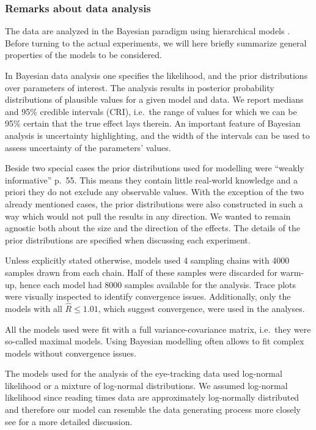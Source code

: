 
\hypertarget{remarks-about-data-analysis}{%
\subsubsection{Remarks about data
analysis}\label{remarks-about-data-analysis}}

The data are analyzed in the Bayesian paradigm using hierarchical models
\citep{gelman2003bda,gelman2006data,mcelreath2018statistical,nicenboim2021introd_bayes_data}.
Before turning to the actual experiments, we will here briefly summarize
general properties of the models to be considered.

In Bayesian data analysis one specifies the likelihood, and the prior
distributions over parameters of interest. The analysis results in
posterior probability distributions of plausible values for a given
model and data. We report medians and 95\% credible intervals (CRI),
i.e.~the range of values for which we can be 95\% certain that the true
effect lays therein. An important feature of Bayesian analysis is
uncertainty highlighting, and the width of the intervals can be used to
assess uncertainty of the parameters' values.

Beside two special cases the prior distributions used for modelling were
``weakly informative'' \citep{gelman2003bda} p.~55. This means they
contain little real-world knowledge and a priori they do not exclude any
observable values. With the exception of the two already mentioned
cases, the prior distributions were also constructed in such a way which
would not pull the results in any direction. We wanted to remain
agnostic both about the size and the direction of the effects. The
details of the prior distributions are specified when discussing each
experiment.

Unless explicitly stated otherwise, models used 4 sampling chains with
4000 samples drawn from each chain. Half of these samples were discarded
for warm-up, hence each model had 8000 samples available for the
analysis. Trace plots were visually inspected to identify convergence
issues. Additionally, only the models with all \(\hat{R} \leq 1.01\),
which suggest convergence, were used in the analyses.

All the models used were fit with a full variance-covariance matrix,
i.e.~they were so-called maximal models. Using Bayesian modelling often
allows to fit complex models without convergence issues.

The models used for the analysis of the eye-tracking data used
log-normal likelihood or a mixture of log-normal distributions. We
assumed log-normal likelihood since reading times data are approximately
log-normally distributed and therefore our model can resemble the data
generating process more closely see \citep{rouder2008hierarchical,Nicenboim_2016,nicenboim2018explor_confir} for a more detailed discussion.

